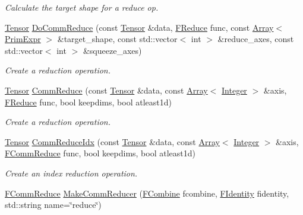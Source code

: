 \begin{DoxyCompactItemize}
\begin{DoxyCompactList}\small\item\em Calculate the target shape for a reduce op. \end{DoxyCompactList}\item 
\hyperlink{classtvm_1_1te_1_1Tensor}{Tensor} \hyperlink{namespacetopi_ab5ae1df78350ee84b7dc49922523365d}{Do\+Comm\+Reduce} (const \hyperlink{classtvm_1_1te_1_1Tensor}{Tensor} \&data, \hyperlink{namespacetopi_a4d0f5ddce836d926393ac3d154170ef6}{F\+Reduce} func, const \hyperlink{classtvm_1_1Array}{Array}$<$ \hyperlink{classtvm_1_1PrimExpr}{Prim\+Expr} $>$ \&target\+\_\+shape, const std\+::vector$<$ int $>$ \&reduce\+\_\+axes, const std\+::vector$<$ int $>$ \&squeeze\+\_\+axes)
\begin{DoxyCompactList}\small\item\em Create a reduction operation. \end{DoxyCompactList}\item 
\hyperlink{classtvm_1_1te_1_1Tensor}{Tensor} \hyperlink{namespacetopi_a173c99250d923eff68fc63925b575497}{Comm\+Reduce} (const \hyperlink{classtvm_1_1te_1_1Tensor}{Tensor} \&data, const \hyperlink{classtvm_1_1Array}{Array}$<$ \hyperlink{classtvm_1_1Integer}{Integer} $>$ \&axis, \hyperlink{namespacetopi_a4d0f5ddce836d926393ac3d154170ef6}{F\+Reduce} func, bool keepdims, bool atleast1d)
\begin{DoxyCompactList}\small\item\em Create a reduction operation. \end{DoxyCompactList}\item 
\hyperlink{classtvm_1_1te_1_1Tensor}{Tensor} \hyperlink{namespacetopi_aa350ed41a0a28c5c90db8ec48b7c3bd2}{Comm\+Reduce\+Idx} (const \hyperlink{classtvm_1_1te_1_1Tensor}{Tensor} \&data, const \hyperlink{classtvm_1_1Array}{Array}$<$ \hyperlink{classtvm_1_1Integer}{Integer} $>$ \&axis, \hyperlink{namespacetopi_a8baac534d5ff12a20f089736a0e60f14}{F\+Comm\+Reduce} func, bool keepdims, bool atleast1d)
\begin{DoxyCompactList}\small\item\em Create an index reduction operation. \end{DoxyCompactList}\item 
\hyperlink{namespacetopi_a8baac534d5ff12a20f089736a0e60f14}{F\+Comm\+Reduce} \hyperlink{namespacetopi_aad827ce961a0d2cbafd181974e05b12d}{Make\+Comm\+Reducer} (\hyperlink{namespacetopi_afa9b3b014bd552948f6fd671465901fa}{F\+Combine} fcombine, \hyperlink{namespacetopi_a180676c7dc5c5716056719a58b60ca2c}{F\+Identity} fidentity, std\+::string name=\char`\"{}reduce\char`\"{})

\end{DoxyCompactItemize}
